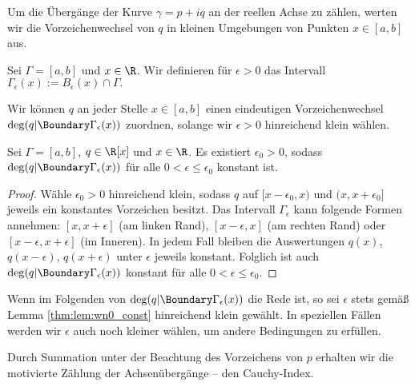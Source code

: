 \documentclass{mythesis}
\begin{document}
Um die Übergänge der Kurve $\gamma = p + iq$ an der reellen Achse zu zählen, werten wir die Vorzeichenwechsel von $q$ in kleinen Umgebungen von Punkten $x \in [a,b]$ aus.

\begin{definition} \label{thm:def:gamma1_eps}
    Sei $\Gamma = [a,b]$ und $x \in \R$.
    Wir definieren für $\epsilon > 0$ das Intervall
    \begin{math}
        \Gamma_\epsilon(x) := B_\epsilon(x) \cap \Gamma.
    \end{math}
\end{definition}

Wir können $q$ an jeder Stelle $x \in [a,b]$ einen eindeutigen Vorzeichenwechsel $\deg(q|\Boundary\Gamma_\epsilon(x))$ zuordnen, solange wir $\epsilon > 0$ hinreichend klein wählen.

\begin{lemma} \label{thm:lem:wn0_const}
    Sei $\Gamma = [a,b]$, $q \in \R[x]$ und $x \in \R$.
    Es existiert $\epsilon_0 > 0$, sodass $\deg(q|\Boundary\Gamma_\epsilon(x))$ für alle $0 < \epsilon \le \epsilon_0$ konstant ist.
    \begin{proof}
        Wähle $\epsilon_0 > 0$ hinreichend klein, sodass $q$ auf $[x-\epsilon_0, x)$ und $(x, x+\epsilon_0]$ jeweils ein konstantes Vorzeichen besitzt.
        Das Intervall $\Gamma_\epsilon$ kann folgende Formen annehmen: $[x, x+\epsilon]$ (am linken Rand), $[x-\epsilon, x]$ (am rechten Rand) oder $[x-\epsilon, x+\epsilon]$ (im Inneren).
        In jedem Fall bleiben die Auswertungen $q(x)$, $q(x-\epsilon)$, $q(x+\epsilon)$ unter $\epsilon$ jeweils konstant.
        Folglich ist auch $\deg(q|\Boundary\Gamma_\epsilon(x))$ konstant für alle $0 < \epsilon \le \epsilon_0$.
    \end{proof}
\end{lemma}

Wenn im Folgenden von $\deg(q|\Boundary\Gamma_\epsilon(x))$ die Rede ist, so sei $\epsilon$ stets gemäß Lemma \ref{thm:lem:wn0_const} hinreichend klein gewählt.
In speziellen Fällen werden wir $\epsilon$ auch noch kleiner wählen, um andere Bedingungen zu erfüllen.

Durch Summation unter der Beachtung des Vorzeichens von $p$ erhalten wir die motivierte Zählung der Achsenübergänge – den Cauchy-Index.
\end{document}

